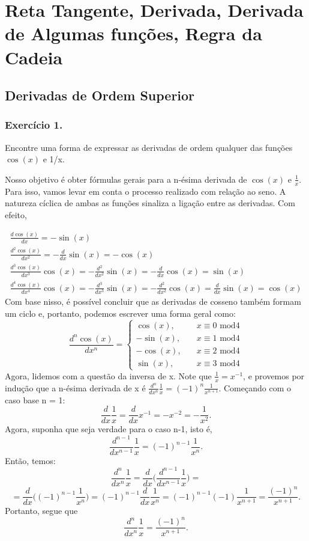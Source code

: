 \section{Reta Tangente, Derivada, Derivada de Algumas fun\c c\~oes, Regra da Cadeia}
\subsection[Derivadas de Ordem Superior]{Derivadas de Ordem Superior}
\subsubsection{Exerc\'icio 1.} Encontre uma forma de expressar as derivadas de ordem qualquer 
das fun\c c\~oes $\cos(x)$ e 1/x.

\begin{proof*}
Nosso objetivo \'e obter f\'ormulas gerais para a n-\'esima derivada de $\cos(x) \text{ e } \frac{1}{x}$. Para isso, vamos levar em conta 
o processo realizado com rela\c c\~ao ao seno. A natureza c\'iclica de ambas as fun\c c\~oes sinaliza
a liga\c c\~ao entre as derivadas. Com efeito, 

$$
\begin{array}{ll}
	\frac{d \cos(x)}{d x} = -\sin(x) \\
	\frac{d^2 \cos(x)}{d x^2} = -\frac{d}{dx}\sin(x) = -\cos(x)\\
	\frac{d^3 \cos(x)}{d x^3}\cos(x) = -\frac{d^2}{dx^2}\sin(x) = -\frac{d}{dx}\cos(x) = \sin(x)\\
	\frac{d^4 \cos(x)}{d x^4}\cos(x) = -\frac{d^3}{dx^3}\sin(x) = -\frac{d^2}{dx^2}\cos(x) = \frac{d}{dx}\sin(x) = \cos(x)
\end{array}
$$  
Com base nisso, \'e poss\'ivel concluir que as derivadas de cosseno tamb\'em formam um ciclo e, portanto, podemos escrever uma forma geral como:
$$
\frac{d^n \cos(x)}{d x^n} = \left\{
\begin{array}{ll}
	\cos(x), &\quad x\equiv 0\text{ mod}4 \\
	-\sin(x), &\quad x\equiv 1\text{ mod}4\\
	-\cos(x), &\quad x\equiv 2\text{ mod}4\\
	\sin(x), &\quad x\equiv 3\text{ mod}4 
\end{array}
\right.
$$
Agora, lidemos com a quest\~ao da inversa de x. Note que $\frac{1}{x} = x^{-1}$, e provemos por indu\c c\~ao que a 
n-\'esima derivada de x \'e $\frac{d^n}{d x^n}\frac{1}{x} = (-1)^n\frac{1}{x^{n+1}}$. Come\c cando 
com o caso base n = 1:
$$
\frac{d}{dx}\frac{1}{x} = \frac{d}{dx}x^{-1} = -x^{-2} = -\frac{1}{x^2}.
$$
Agora, suponha que seja verdade para o caso n-1, isto \'e, 
$$
\frac{d^{n-1}}{d x^{n-1}}\frac{1}{x} = (-1)^{n-1}\frac{1}{x^n}. 
$$
Ent\~ao, temos:
$$
\frac{d^{n}}{d x^{n}}\frac{1}{x} = \frac{d}{dx}\biggl(\frac{d^{n-1}}{d x^{n-1}}\frac{1}{x}\biggr) = 
$$
$$
=\frac{d}{dx}\biggl((-1)^{n-1}\frac{1}{x^n}\biggr) 
= (-1)^{n-1}\frac{d}{dx}\frac{1}{x^n} = (-1)^{n-1}(-1)\frac{1}{x^{n+1}}
= \frac{(-1)^n}{x^{n+1}}.
$$
Portanto, segue que
$$
\frac{d^{n}}{d x^{n}}\frac{1}{x} = \frac{(-1)^n}{x^{n+1}}.
$$
\end{proof*}

